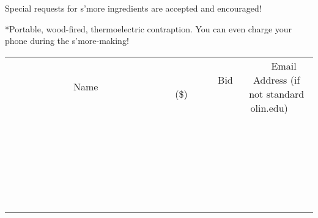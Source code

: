 \documentclass[11pt]{article}
\begin{document}
Special requests for s'more ingredients are accepted and encouraged!

*Portable, wood-fired, thermoelectric contraption. You can even charge your phone during the s'more-making!
\\[6ex]
\begin{tabular}{c c c}
~~~~~~~~~~~~~Name~~~~~~~~~~~~~ & ~~~~~~~~~Bid (\$)~~~~~~~~~  & ~~~Email Address (if not standard olin.edu)~~~\\
 & & \\
\hline
 & & \\
\hline
 & & \\
\hline
 & & \\
\hline
 & & \\
\hline
 & & \\
\hline
 & & \\
\hline
 & & \\
\hline
 & & \\
\hline
 & & \\
\hline
 & & \\
\hline
 & & \\
\hline
 & & \\
\hline
 & & \\
\hline
 & & \\
\hline
 & & \\
\hline
 & & \\
\hline
 & & \\
\hline
 & & \\
\hline
 & & \\
\hline
 & & \\
\hline
 & & \\
\hline
 & & \\
\hline
 & & \\
\hline
 & & \\
\hline
 & & \\
\hline
\end{tabular}
\newpage
\end{document}
